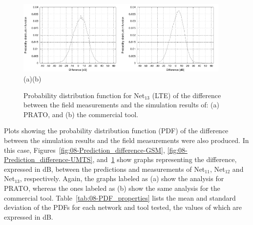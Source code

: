\begin{figure}[h]
\centering

\includegraphics[width=0.47\textwidth]{08-real_network_planning/img/lte_prato_diff}\includegraphics[width=0.47\textwidth]{08-real_network_planning/img/lte_tcpu_diff}\\\hspace{0.4cm}(a)\hspace{6.7cm}(b)

\caption{Probability distribution function for Net$_{13}$ (LTE) of the difference
between the field measurements and the simulation results of: (a)
PRATO, and (b) the commercial tool.\label{fig:08-Prediction_difference-LTE}}
\end{figure}


Plots showing the probability distribution function (PDF)
of the difference between the simulation results and the field measurements
were also produced. In this case, Figures~\ref{fig:08-Prediction_difference-GSM},
\ref{fig:08-Prediction_difference-UMTS}, and~\ref{fig:08-Prediction_difference-LTE}
show graphs representing the difference, expressed in dB, between
the predictions and measurements of Net$_{11}$, Net$_{12}$ and Net$_{13}$,
respectively. Again, the graphs labeled as (a) show the analysis for
PRATO, whereas the ones labeled as (b) show the same analysis for
the commercial tool. Table~\ref{tab:08-PDF_properties} lists the
mean and standard deviation of the PDFs for each network and tool
tested, the values of which are expressed in dB.

